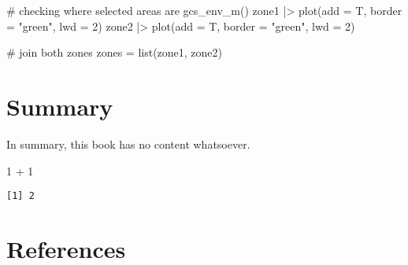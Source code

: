 \documentclass[
  letterpaper,
  DIV=11,
  numbers=noendperiod]{scrreprt}
\newenvironment{Shaded}{\begin{snugshade}}{\end{snugshade}}
\newcommand{\AttributeTok}[1]{\textcolor[rgb]{0.40,0.45,0.13}{#1}}
\newcommand{\CommentTok}[1]{\textcolor[rgb]{0.37,0.37,0.37}{#1}}
\newcommand{\DecValTok}[1]{\textcolor[rgb]{0.68,0.00,0.00}{#1}}
\newcommand{\FunctionTok}[1]{\textcolor[rgb]{0.28,0.35,0.67}{#1}}
\newcommand{\NormalTok}[1]{\textcolor[rgb]{0.00,0.23,0.31}{#1}}
\newcommand{\OtherTok}[1]{\textcolor[rgb]{0.00,0.23,0.31}{#1}}
\newcommand{\SpecialCharTok}[1]{\textcolor[rgb]{0.37,0.37,0.37}{#1}}
\newcommand{\StringTok}[1]{\textcolor[rgb]{0.13,0.47,0.30}{#1}}
\newlength{\cslhangindent}
\newlength{\cslentryspacingunit} %
\newenvironment{CSLReferences}[2] %
 {%
  \setlength{\parindent}{0pt}
  \ifodd #1
  \let\oldpar\par
  \def\par{\hangindent=\cslhangindent\oldpar}
  \fi
  \setlength{\parskip}{#2\cslentryspacingunit}
 }%
 {}
\begin{document}
\begin{Shaded}
\begin{Highlighting}[]
\CommentTok{\# checking where selected areas are}
\FunctionTok{gcs\_env\_m}\NormalTok{()}
\NormalTok{zone1 }\SpecialCharTok{|\textgreater{}} \FunctionTok{plot}\NormalTok{(}\AttributeTok{add =}\NormalTok{ T, }\AttributeTok{border =} \StringTok{"green"}\NormalTok{, }\AttributeTok{lwd =} \DecValTok{2}\NormalTok{)}
\NormalTok{zone2 }\SpecialCharTok{|\textgreater{}} \FunctionTok{plot}\NormalTok{(}\AttributeTok{add =}\NormalTok{ T, }\AttributeTok{border =} \StringTok{"green"}\NormalTok{, }\AttributeTok{lwd =} \DecValTok{2}\NormalTok{)}

\CommentTok{\# join both zones}
\NormalTok{zones }\OtherTok{=} \FunctionTok{list}\NormalTok{(zone1, zone2)}
\end{Highlighting}
\end{Shaded}

\hypertarget{summary}{%
\chapter{Summary}\label{summary}}

In summary, this book has no content whatsoever.

\begin{Shaded}
\begin{Highlighting}[]
\DecValTok{1} \SpecialCharTok{+} \DecValTok{1}
\end{Highlighting}
\end{Shaded}

\begin{verbatim}
[1] 2
\end{verbatim}

\hypertarget{references}{%
\chapter*{References}\label{references}}

\hypertarget{refs}{}
\begin{CSLReferences}{0}{0}
\end{CSLReferences}
\end{document}
